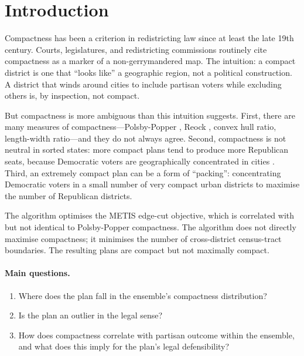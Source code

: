 \section{Introduction}
\label{sec:intro}

Compactness has been a criterion in redistricting law since at least the
late 19th century.  Courts, legislatures, and redistricting commissions
routinely cite compactness as a marker of a non-gerrymandered map.  The
intuition: a compact district is one that ``looks like'' a geographic region,
not a political construction.  A district that winds around cities to include
partisan voters while excluding others is, by inspection, not compact.

But compactness is more ambiguous than this intuition suggests.  First,
there are many measures of compactness---Polsby-Popper \citep{polsby1991third},
Reock \citep{reock1961note}, convex hull ratio, length-width ratio---and they
do not always agree.  Second, compactness is not neutral in sorted states:
more compact plans tend to produce more Republican seats, because Democratic
voters are geographically concentrated in cities \citep{rodden2019why}.
Third, an extremely compact plan can be a form of ``packing'': concentrating
Democratic voters in a small number of very compact urban districts to
maximise the number of Republican districts.

The \ar{} algorithm \citep{dellaLibera2026b11} optimises the METIS edge-cut
objective, which is correlated with but not identical to Polsby-Popper
compactness.  The algorithm does not directly maximise compactness; it
minimises the number of cross-district census-tract boundaries.  The resulting
plans are compact but not maximally compact.

\paragraph{Main questions.}
\begin{enumerate}
  \item Where does the \ar{} plan fall in the \recom{} ensemble's compactness
    distribution?
  \item Is the \ar{} plan an outlier in the legal sense?
  \item How does compactness correlate with partisan outcome within the ensemble,
    and what does this imply for the \ar{} plan's legal defensibility?
\end{enumerate}

